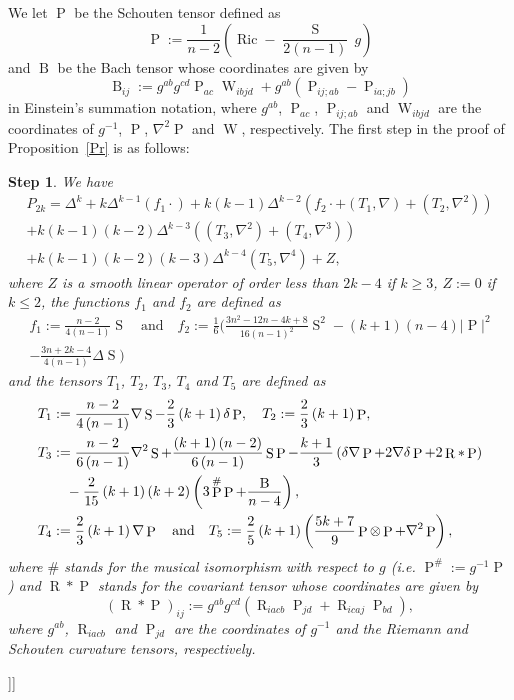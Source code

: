 \documentclass[reqno]{amsart}
\numberwithin{equation}{section}
\DeclareMathOperator{\Scal}{S}
\DeclareMathOperator{\Ricci}{Ric}
\DeclareMathOperator{\Riemann}{R}
\DeclareMathOperator{\Weyl}{W}
\DeclareMathOperator{\Schouten}{P}
\DeclareMathOperator{\Bach}{B}
\newcommand{\<}{\left<}
\renewcommand{\>}{\right>}
\renewcommand{\[}{\left[}
\renewcommand{\]}{\right]}
\renewcommand{\(}{\left(}
\renewcommand{\)}{\right)}
\newtheorem{step}{Step}[section]
\begin{document}
\[\[\proof[Proof of Proposition~\ref{Pr}]
We let $\Schouten$ be the Schouten tensor defined as
$$\Schouten:=\frac{1}{n-2}\(\Ricci-\frac{\Scal}{2\(n-1\)}\,g\)$$
and $\Bach$ be the Bach tensor whose coordinates are given by
$$\Bach_{ij}:=g^{ab}g^{cd}\Schouten_{ac}\Weyl_{ibjd}+g^{ab}\(\Schouten_{ij;ab}-\Schouten_{ia;jb}\)$$
in Einstein's summation notation, where $g^{ab}$, $\Schouten_{ac}$, $\Schouten_{ij;ab}$ and $\Weyl_{ibjd}$ are the coordinates of $g^{-1}$, $\Schouten$, $\nabla^2\Schouten$ and $\Weyl$, respectively. The first step in the proof of Proposition~\ref{Pr} is as follows:

\begin{step}\label{Step1}
We have 
\begin{multline}\label{Step1Eq1}
P_{2k}=\Delta^k+k\Delta^{k-1}\(f_1\cdot\)+k\(k-1\)\Delta^{k-2}\(f_2\cdot+\(T_1,\nabla\)+\(T_2,\nabla^2\)\)\\
+k\(k-1\)\(k-2\)\Delta^{k-3}\(\(T_3,\nabla^2\)+\(T_4,\nabla^3\)\)\\
+k\(k-1\)\(k-2\)\(k-3\)\Delta^{k-4}\(T_5,\nabla^4\)+Z,
\end{multline}
where $Z$ is a smooth linear operator of order less than $2k-4$ if $k\ge3$, $Z:=0$ if $k\le2$, the functions $f_1$ and $f_2$ are defined as 
\begin{multline*}
f_1:=\frac{n-2}{4\(n-1\)}\Scal\quad\text{and}\quad f_2:=\frac{1}{6}\bigg(\frac{3n^2-12n-4k+8}{16\(n-1\)^2}\Scal^2-\(k+1\)\(n-4\)\left|\Schouten\right|^2\\-\frac{3n+2k-4}{4\(n-1\)}\Delta\Scal\bigg)
\end{multline*}
and the tensors $T_1$, $T_2$, $T_3$, $T_4$ and $T_5$ are defined as
\begin{align*}
&T_1:=\frac{n-2}{4\(n-1\)}\nabla\Scal-\frac{2}{3}\(k+1\)\delta \Schouten,\quad T_2:=\frac{2}{3}\(k+1\)\Schouten,\allowdisplaybreaks\\
&T_3:=\frac{n-2}{6\(n-1\)}\nabla^2\Scal+\frac{\(k+1\)\(n-2\)}{6\(n-1\)}\Scal\Schouten-\frac{k+1}{3}\(\delta\nabla\Schouten+2\nabla\delta\Schouten+2\Riemann\ast\Schouten\)\\
&\qquad-\frac{2}{15}\(k+1\)\(k+2\)\(3\Schouten^{\#}\Schouten+\frac{\Bach}{n-4}\),\allowdisplaybreaks\\
&T_4:=\frac{2}{3}\(k+1\)\nabla \Schouten\quad\text{and}\quad T_5:=\frac{2}{5}\(k+1\)\(\frac{5k+7}{9}\Schouten\otimes \Schouten+\nabla^2\Schouten\),
\end{align*}
where $\#$ stands for the musical isomorphism with respect to $g$ (i.e. $\Schouten^\#:=g^{-1}\Schouten$) and $\Riemann\ast\Schouten$ stands for the covariant tensor whose coordinates are given by 
\begin{equation}\label{Step1Eq2}
\(\Riemann\ast\Schouten\)_{ij}:=g^{ab}g^{cd}\(\Riemann_{iacb}\Schouten_{jd}+\Riemann_{icaj}\Schouten_{bd}\),
\end{equation}
where $g^{ab}$, $\Riemann_{iacb}$ and $\Schouten_{jd}$ are the coordinates of $g^{-1}$ and the Riemann and Schouten curvature tensors, respectively.
\end{step}

\]\]
\end{document}
